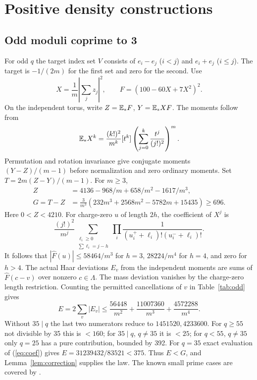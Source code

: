 \documentclass[11pt]{article}
\begin{document}
\section{Positive density constructions}\label{sec:density}
\subsection{Odd moduli coprime to 3}
For odd $q$ the target index set $V$ consists of $e_i-e_j$ ($i<j$) and $e_i+e_j$ ($i\le j$). The target is $-1/(2m)$ for the first set and zero for the second. Use
\begin{equation} X=\frac{1}{m}\left|\sum_j z_j\right|^2,\qquad F=(100-60X+7X^2)^2.\end{equation}
On the independent torus, write $Z=\mathbb E_*F$, $Y=\mathbb E_*XF$. The moments follow from
\[\mathbb E_*X^k=\frac{(k!)^2}{m^k}[t^k]\left(\sum_{j=0}^k\frac{t^j}{(j!)^2}\right)^m.\]
Permutation and rotation invariance give conjugate moments $(Y-Z)/(m-1)$ before normalization and zero ordinary moments. Set $T=2m(Z-Y)/(m-1)$. For $m\ge3$,
\begin{align}Z&=4136-968/m+658/m^2-1617/m^3,\\G=T-Z&=\frac{3}{m^3}(232m^3+2568m^2-5782m+15435)\ge696.\end{align}
Here $0<Z<4210$. For charge-zero $u$ of length $2h$, the coefficient of $X^j$ is
\begin{equation}\label{eq:coef}\frac{(j!)^2}{m^j}\sum_{\substack{\ell_i\ge0\\\sum\ell_i=j-h}}\prod_i\frac{1}{(u_i^++\ell_i)!(u_i^-+\ell_i)!}.\end{equation}
It follows that $|\widehat F(u)|\le58464/m^3$ for $h=3$, $28224/m^4$ for $h=4$, and zero for $h>4$. The actual Haar deviations $E_v$ from the independent moments are sums of $\widehat F(c-v)$ over nonzero $c\in\Lambda$. The mass deviation vanishes by the charge-zero length restriction. Counting the permitted cancellations of $v$ in Table~\ref{tab:odd} gives
\begin{equation}E=2\sum_v|E_v|\le\frac{56448}{m^2}+\frac{11007360}{m^3}+\frac{4572288}{m^4}.\end{equation}
Without $35\mid q$ the last two numerators reduce to $1451520,4233600$. For $q\ge55$ not divisible by 35 this is $<160$; for $35\mid q$, $q\ne35$ it is $<25$; for $q<55$, $q\ne35$ only $q=25$ has a pure contribution, bounded by 392. For $q=35$ exact evaluation of (\ref{eq:coef}) gives $E=31239432/83521<375$. Thus $E<G$, and Lemma~\ref{lem:correction} supplies the law. The known small prime cases are covered by \cite{kang}.
\end{document}
